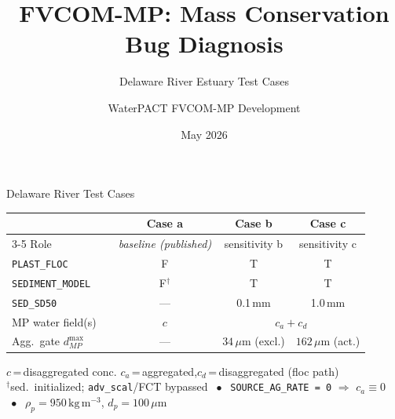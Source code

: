 \documentclass[aspectratio=169,10pt]{beamer}
\title{FVCOM-MP: Mass Conservation Bug Diagnosis}
\subtitle{Delaware River Estuary Test Cases}
\author{WaterPACT FVCOM-MP Development}
\date{May 2026}
\newcommand{\ca}{\textcolor{OliveGreen}{\textbf{a}}}
\newcommand{\cb}{\textcolor{NavyBlue}{\textbf{b}}}
\newcommand{\cc}{\textcolor{BurntOrange}{\textbf{c}}}
\begin{document}
\begin{frame}
  \titlepage
\end{frame}

\begin{frame}{Delaware River Test Cases}
  \centering
  \vspace{0.3em}
  \footnotesize
  \begin{tabular}{lcccc}
    \toprule
    & & Case \ca & Case \cb & Case \cc \\
    \cmidrule(lr){3-5}
    Role & & \textit{baseline (published)} & sensitivity b & sensitivity c \\
    \midrule
    \texttt{PLAST\_FLOC}   & & F & T & T \\
    \texttt{SEDIMENT\_MODEL} & & F$^{\dagger}$ & T & T \\
    \texttt{SED\_SD50}     & & --- & 0.1\,mm & 1.0\,mm \\
    MP water field(s)      & & $c$ &
                             \multicolumn{2}{c}{$c_a + c_d$} \\
    Agg.\ gate $d_{MP}^{\max}$ & & --- &
                             $34\,\mu$m (excl.) &
                             $162\,\mu$m (act.) \\
    \bottomrule
  \end{tabular}

  \vspace{0.5em}
  {\footnotesize
    $c$\,=\,disaggregated conc.\hfill
    $c_a$\,=\,aggregated,\;$c_d$\,=\,disaggregated (floc path)\\[2pt]
    $^{\dagger}$sed.\ initialized; \texttt{adv\_scal}/FCT bypassed
    $\;\bullet\;$
    \texttt{SOURCE\_AG\_RATE\,=\,0} $\Rightarrow$ $c_a\equiv 0$
    $\;\bullet\;$
    $\rho_p=950\,\mathrm{kg\,m^{-3}}$,\; $d_p=100\,\mu\mathrm{m}$}
\end{frame}
\end{document}

